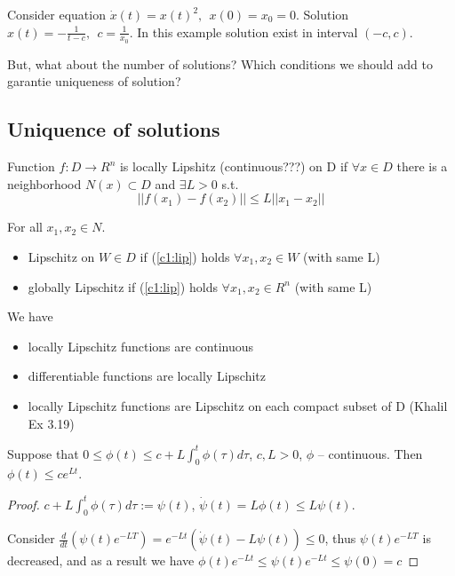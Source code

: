 \begin{Example}
Consider equation $\dot x(t) = x(t)^2, \ \ x(0)=x_0=0$. Solution 
$x(t)=-\frac{1}{t-c}, \ \ c=\frac{1}{x_0}$. In this example
solution exist in interval $(-c, c)$.
\end{Example}


But, what about the number of solutions? Which conditions we should
add to garantie uniqueness of solution?


\subsection{Uniquence of solutions}

\begin{Definition}
Function $f:D \rightarrow R^n$ is locally Lipshitz (continuous???) on D
if $\forall x \in D$ there is a neighborhood $N(x) \subset D$ and
$\exists L > 0$ s.t. 
\begin{equation}\label{c1:lip}
||f(x_1)-f(x_2)|| \le L ||x_1 - x_2|| 
\end{equation}

For all $x_1,x_2 \in N$.
\end{Definition}

\begin{itemize}
\item Lipschitz on $W \in D$ if (\ref{c1:lip}) holds $\forall x_1,x_2 \in W$ 
(with same L)
\item globally Lipschitz if (\ref{c1:lip}) holds $\forall x_1, x_2 \in R^n$
(with same L)
\end{itemize}


We have
\begin{itemize}[label=$\#$]
 \item locally Lipschitz functions are continuous
 \item differentiable functions are locally Lipschitz
 \item locally Lipschitz functions are Lipschitz on each compact subset of D
 	(Khalil Ex 3.19)
\end{itemize}

\begin{Lemma}[Cromwall]
Suppose that $0 \le \phi(t) \le c + L \int^t_0 \phi(\tau) d \tau$, $c,L > 0$, $\phi$ -- 
continuous. Then $\phi(t) \le c e^{Lt}$.
\begin{proof}
$c + L\int^t_0 \phi(\tau) d \tau := \psi(t)$, $\dot \psi(t) = L\phi(t) \le L \psi (t)$.

Consider $\frac{d}{dt} \left(\psi(t) e^{-LT}\right) = e^{-Lt}
 \left( \dot \psi(t)-L \psi(t) \right) \le 0$, thus $\psi(t) e^{-LT}$ is
decreased, and as a result we have $\phi(t)e^{-Lt}\le \psi(t)e^{-Lt}\le \psi(0)=c$ 

\end{proof}
\end{Lemma}

